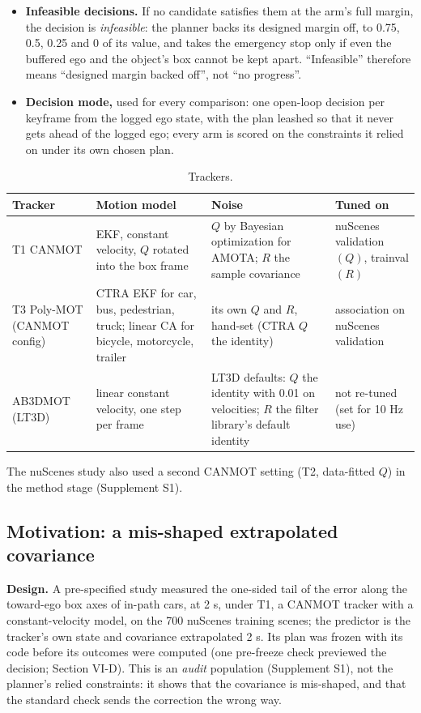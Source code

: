 \documentclass{ieeeaccess}
\begin{document}
\begin{itemize}
\item \textbf{Infeasible decisions.} If no candidate satisfies them at the arm's full margin, the decision is \emph{infeasible}: the planner backs its designed margin off, to 0.75, 0.5, 0.25 and 0 of its value, and takes the emergency stop only if even the buffered ego and the object's box cannot be kept apart. ``Infeasible'' therefore means ``designed margin backed off'', not ``no progress''.
\item \textbf{Decision mode,} used for every comparison: one open-loop decision per keyframe from the logged ego state, with the plan leashed so that it never gets ahead of the logged ego; every arm is scored on the constraints it relied on under its own chosen plan.
\end{itemize}

\begin{table}[!t]
\centering
\caption{Trackers.}
\label{tab:1}
\footnotesize
\setlength{\tabcolsep}{4pt}
\renewcommand{\arraystretch}{1.15}
\begin{tabular}{@{}L{0.244\textwidth}L{0.263\textwidth}L{0.292\textwidth}L{0.149\textwidth}@{}}
\hline
Tracker & Motion model & Noise & Tuned on \\
\hline
T1 CANMOT  & EKF, constant velocity, $Q$ rotated into the box frame & $Q$ by Bayesian optimization for AMOTA; $R$ the sample covariance & nuScenes validation $(Q)$, trainval $(R)$ \\
T3 Poly-MOT  (CANMOT config) & CTRA EKF for car, bus, pedestrian, truck; linear CA for bicycle, motorcycle, trailer & its own $Q$ and $R$, hand-set (CTRA $Q$ the identity) & association on nuScenes validation \\
AB3DMOT (LT3D) & linear constant velocity, one step per frame & LT3D defaults: $Q$ the identity with 0.01 on velocities; $R$ the filter library's default identity & not re-tuned (set for 10 Hz use) \\
\hline
\end{tabular}
\end{table}

The nuScenes study also used a second CANMOT setting (T2, data-fitted $Q$) in the method stage (Supplement S1).

\subsection{Motivation: a mis-shaped extrapolated covariance}
\textbf{Design.} A pre-specified study measured the one-sided tail of the error along the toward-ego box axes of in-path cars, at 2 s, under T1, a CANMOT tracker with a constant-velocity model, on the 700 nuScenes training scenes; the predictor is the tracker's own state and covariance extrapolated 2 s. Its plan was frozen with its code before its outcomes were computed (one pre-freeze check previewed the decision; Section VI-D). This is an \emph{audit} population (Supplement S1), not the planner's relied constraints: it shows that the covariance is mis-shaped, and that the standard check sends the correction the wrong way.
\end{document}
